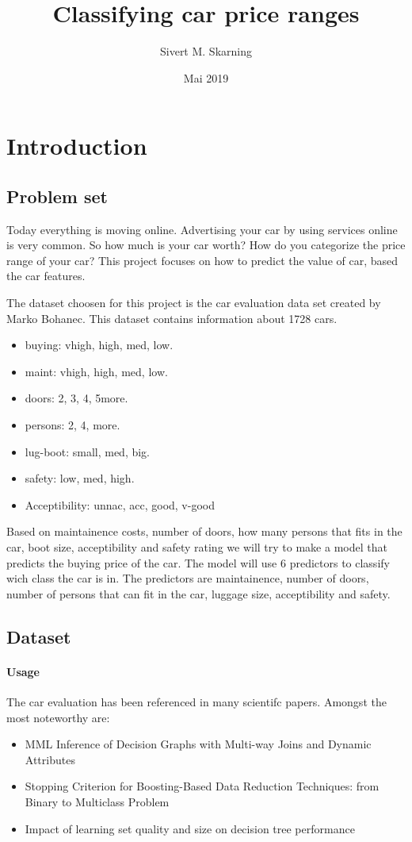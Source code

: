 \documentclass[a4paper, 12pt]{article}
\title{Classifying car price ranges}
\author{Sivert M. Skarning}
\date{Mai 2019}
\begin{document}
\maketitle
\clearpage

\section{Introduction}
\subsection{Problem set}
Today everything is moving online. Advertising your car by using services online is very common. So how much is your car worth? How do you categorize the price range of your car? This project focuses on how to predict the value of car, based the car features.

The dataset choosen for this project is the car evaluation data set created by Marko Bohanec. This dataset contains information about 1728 cars.

\begin{itemize}
  \item buying: vhigh, high, med, low.
  \item maint: vhigh, high, med, low.
  \item doors: 2, 3, 4, 5more.
  \item persons: 2, 4, more.
  \item lug-boot: small, med, big.
  \item safety: low, med, high.
  \item Acceptibility: unnac, acc, good, v-good
\end{itemize}

Based on maintainence costs, number of doors, how many persons that fits in the car, boot size, acceptibility and safety rating we will try to make a model that predicts the buying price of the car. The model will use 6 predictors to classify wich class the car is in. The predictors are maintainence, number of doors, number of persons that can fit in the car, luggage size, acceptibility and safety.


\subsection{Dataset}
\paragraph{Usage}
The car evaluation has been referenced in many scientifc papers. Amongst the most noteworthy are:
\begin{itemize}
\item MML Inference of Decision Graphs with Multi-way Joins and Dynamic Attributes \cite{mml-interference}
\item Stopping Criterion for Boosting-Based Data Reduction Techniques: from Binary to Multiclass Problem \cite{boosting}
\item Impact of learning set quality and size on decision tree performance \cite{learning-set}
\end{itemize}
\end{document}
